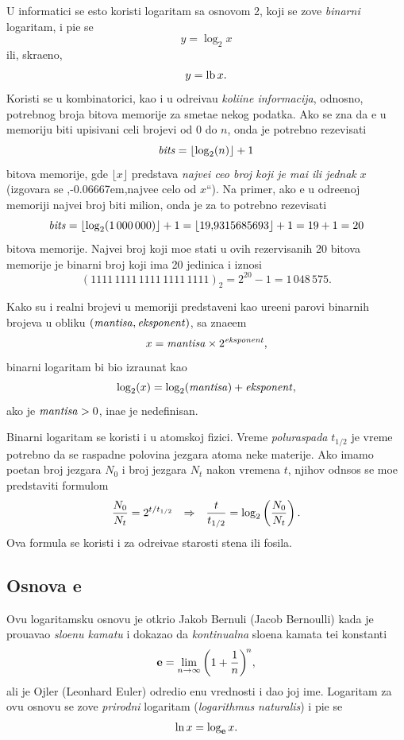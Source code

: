 \documentclass[12pt, twoside, a4paper]{article}
\def\navod#1{\relax,\kern-0.06667em,\relax#1\relax``\relax}
\def\logtwo{\log_2}
\def\puta{\times}
\def\.{{,}}
\def\e{{\bf e}}
\def\th{t_{1/2}}
\def\sledi{{\quad\Rightarrow\quad}}
\begin{document}
U informatici se {\cv}esto koristi logaritam sa osnovom 2, koji se zove {\sl binarni\/} logaritam,
i pi{\sv}e se
$$
y=\logtwo x
$$
ili, skra{\cc}eno,
$$
y=\mathop{\rm lb} x.
$$
Koristi se u kombinatorici, kao i u odre{\dj}iva{\nj}u {\sl koli{\cv}ine informacija},
odnosno, potrebnog broja bitova me\-mo\-ri\-je za sme{\sv}ta{\nj}e nekog podatka.
Ako se zna da {\cc}e u me\-mo\-ri\-ju biti upisivani celi brojevi od 0 do $n$, onda je potrebno rezevisati
$$
\bits = \lfloor\logtwo(n)\rfloor+1
$$
bitova memorije, gde $\lfloor x\rfloor$ predstav{\lj}a {\sl najve{\cc}i ceo broj koji je ma{\nj}i ili jednak} $x$
(izgovara se \navod{najve{\cc}e celo od $x$}). 
Na primer, ako {\cc}e u odre{\dj}enoj memoriji najve{\cc}i 
broj biti milion, onda je za to potrebno rezevisati
$$
\bits=\lfloor\logtwo(1\,000\,000)\rfloor+1=\lfloor 19\.9315685693\rfloor+1 = 19+1=20
$$
bitova memorije. Najve{\cc}i broj koji mo{\zv}e stati u ovih rezervisanih 20 bitova memorije je binarni broj koji ima 20 jedinica
i iznosi 
$$
(1111\,1111\,1111\,1111\,1111)_2=
2^{20}-1=1\,048\,575.
$$

Kako su i realni brojevi u memoriji predstav{\lj}eni kao ure{\dj}eni parovi binarnih brojeva u obliku
$({\it mantisa},{\it eksponent})$, sa zna{\cv}e{\nj}em
$$
x=\mant\puta2^\expo,
$$
binarni logaritam bi bio izra{\cv}unat kao
$$
\logtwo(x)=\logtwo(\mant)+\expo,
$$
ako je ${\it mantisa}>0$, ina{\cv}e je nedefinisan.

\smallskip

Binarni logaritam se koristi i u atomskoj fizici.
Vreme {\sl poluraspada\/} $\th$ je vreme potrebno da se raspadne polovina jezgara atoma neke materije. 
Ako imamo po{\cv}etan broj jezgara $N_0$ i broj jezgara $N_t$ nakon vremena $t$, njihov odnsos
se mo{\zv}e pred\-sta\-vi\-ti formulom
\begin{equation}
\label{eq:halftime}
{N_0\over N_t}=2^{t/\th}\sledi {t\over\th}=\logtwo\left( {N_0\over N_t} \right).
\end{equation}
Ova formula se koristi i za odre{\dj}iva{\nj}e starosti stena ili fosila.



\subsection{Osnova \e}

Ovu logaritamsku osnovu je otkrio Jakob Bernuli (Jacob Bernoulli) kada je
prou{\cv}avao {\sl slo{\zv}enu kamatu\/} i dokazao da {\sl kontinualna\/} slo{\zv}ena kamata
te{\zv}i konstanti
$$
\e=\lim_{n\to\infty}\left(1+{1\over n}\right)^{\!n}\!,
$$
ali je Ojler (Leonhard Euler)
odredio {\nj}enu vrednosti i dao joj ime.
Logaritam za ovu osnovu se zove {\sl prirodni\/} logaritam ({\sl logarithmus naturalis\/})
i pi{\sv}e se
$$
\ln x=\log_\e x.
$$
\end{document}
